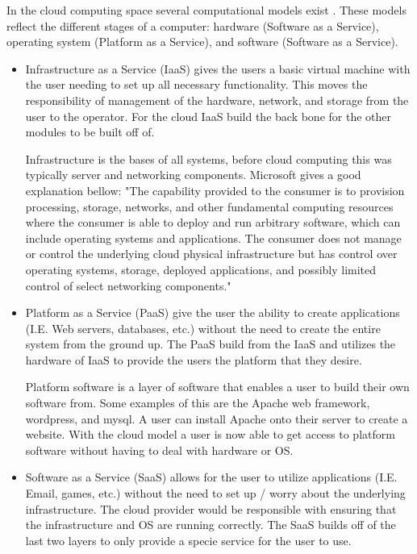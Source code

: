 \documentclass[12pt]{article}
\begin{document}
In the cloud computing space several computational models exist \cite{neto2011demystifying}. These models reflect the different stages of a computer: hardware (Software as a Service), operating system (Platform as a Service), and software (Software as a Service).

\begin{itemize}
    \item Infrastructure as a Service (IaaS) gives the users a basic virtual machine with the user needing to set up all necessary functionality. This moves the responsibility of management of the hardware, network, and storage from the user to the operator. For the cloud IaaS build the back bone for the other modules to be built off of.

        Infrastructure is the bases of all systems, before cloud computing this was typically server and networking components. Microsoft gives a good explanation bellow:
        "The capability provided to the consumer is to provision processing, storage, networks, and other fundamental computing resources where the consumer is able to deploy and run arbitrary software, which can include operating systems and applications. The consumer does not manage or control the underlying cloud physical infrastructure but has control over operating systems, storage, deployed applications, and possibly limited control of select networking components." \cite{TechWikiMic}

    \item Platform as a Service (PaaS) give the user the ability to create applications (I.E. Web servers, databases, etc.) without the need to create the entire system from the ground up. The PaaS build from the IaaS and utilizes the hardware of IaaS to provide the users the platform that they desire.

        Platform software is a layer of software that enables a user to build their own software from. Some examples of this are the Apache web framework, wordpress, and mysql. A user can install Apache onto their server to create a website. With the cloud model a user is now able to get access to platform software without having to deal with hardware or OS.

    \item Software as a Service (SaaS) allows for the user to utilize applications (I.E. Email, games, etc.) without the need to set up / worry about the underlying infrastructure. The cloud provider would be responsible with ensuring that the infrastructure and OS are running correctly. The SaaS builds off of the last two layers to only provide a specie service for the user to use.


\end{itemize}
\end{document}
